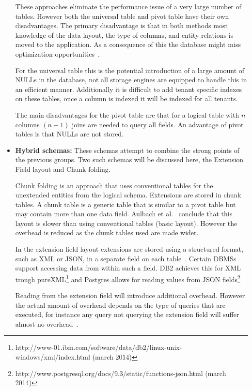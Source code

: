 \begin{itemize}
		These approaches eliminate the performance issue of a very large number of tables.
		However both the universal table and pivot table have their own disadvantages. 
		The primary disadvantage is that in both methods most knowledge of the data layout, the type of columns, and entity relations is moved to the application.
		As a consequence of this the database might miss optimization opportunities~\cite{schiller2011native}.

		For the universal table this is the potential introduction of a large amount of NULLs in the database, not all storage engines are equipped to handle this in an efficient manner. 
		Additionally it is difficult to add tenant specific indexes on these tables, once a column is indexed it will be indexed for all tenants.

		The main disadvantages for the pivot table are that for a logical table with $n$ columns $(n-1)$ joins are needed to query all fields. 
		An advantage of pivot tables is that NULLs are not stored.
	\item \textbf{Hybrid schemas:} These schemas attempt to combine the strong points of the previous groups. 
		Two such schemas will be discussed here, the Extension Field layout and Chunk folding.

		Chunk folding is an approach that uses conventional tables for the unextended entities from the logical schema.
		Extensions are stored in chunk tables. A chunk table is a generic table that is similar to a pivot table but may contain more than one data field.
		Aulbach et al.~\cite{aulbach2008multi} conclude that this layout is slower than using conventional tables (basic layout). 
		However the overhead is reduced as the chunk tables used are made wider. 

		In the extension field layout extensions are stored using a structured format, such as XML or JSON, in a separate field on each table~\cite{aulbach2009comparison}.
		Certain \acp{DBMS} support accessing data from within such a field. DB2 achieves this for XML trough pureXML\footnote{http://www-01.ibm.com/software/data/db2/linux-unix-windows/xml/index.html (march 2014)} and Postgres allows for reading values from JSON fields\footnote{http://www.postgresql.org/docs/9.3/static/functions-json.html (march 2014)}
		
		Reading from the extension field will introduce additional overhead. However the actual amount of overhead depends on the type of queries that are executed, for instance any query not querying the extension field will suffer almost no overhead~\cite{aulbach2009comparison}.
\end{itemize}

